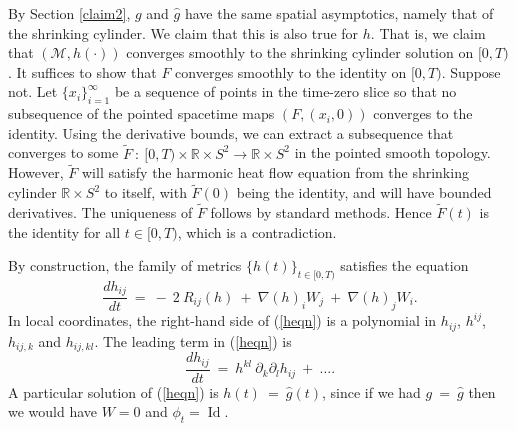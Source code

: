 \documentclass[12pt]{amsart}
\newcommand{\Id}{\operatorname{Id}}
\newcommand{\M}{{\mathcal M}}
\newcommand{\R}{{\mathbb R}}
\numberwithin{equation}{section}
\theoremstyle{plain}
\theoremstyle{definition}
\theoremstyle{remark}
\begin{document}
By Section \ref{claim2}, $g$ and $\widehat{g}$ have the
same spatial asymptotics, namely that of the shrinking cylinder.
We claim that this is also true for $h$. That is, we claim that
$(\M, h(\cdot))$ converges
smoothly to the shrinking cylinder solution on $[0, T)$.
It suffices to show that $F$ converges smoothly to the identity
on $[0, T)$.
Suppose not.  Let $\{x_i\}_{i=1}^\infty$ be a sequence of
points in
the time-zero slice so that no subsequence of
the pointed spacetime maps $(F, (x_i, 0))$ converges to the identity.
Using the derivative
bounds, we can extract a subsequence that converges 
to some $\widetilde{F} \: : \: [0, T) \times \R \times S^2 \rightarrow 
\R \times S^2$ in the pointed smooth topology.
However, $\widetilde{F}$ will satisfy the harmonic heat flow
equation from the shrinking cylinder $\R \times S^2$ to itself, with 
$\widetilde{F}(0)$ being the identity, and will have bounded derivatives.
The uniqueness of $\widetilde{F}$ follows by standard methods. 
Hence $\widetilde{F}(t)$ is the identity for all $t \in [0, T)$, 
which is a contradiction.

By construction, the family of metrics $\{h(t)\}_{t \in [0, T)}$ satisfies
the equation
\begin{equation} \label{heqn}
\frac{dh_{ij}}{dt} \: = \: - \: 2 \: R_{ij}(h) \: + \:
\nabla(h)_i W_j \: + \: \nabla(h)_j W_i.
\end{equation}
In local coordinates, 
the right-hand side of (\ref{heqn}) is a polynomial in 
$h_{ij}$, $h^{ij}$, $h_{ij,k}$ and $h_{ij,kl}$. The leading term in
(\ref{heqn}) is
\begin{equation} \label{hder}
\frac{dh_{ij}}{dt} \: = \: h^{kl} \: \partial_k \partial_l h_{ij}
\: + \: \ldots.
\end{equation}
A particular solution of (\ref{heqn}) is $h(t) \: = \:
\widehat{g}(t)$, since if we had $g \: = \: \widehat{g}$ then
we would have $W = 0$ and $\phi_t = \Id$.
\end{document}
